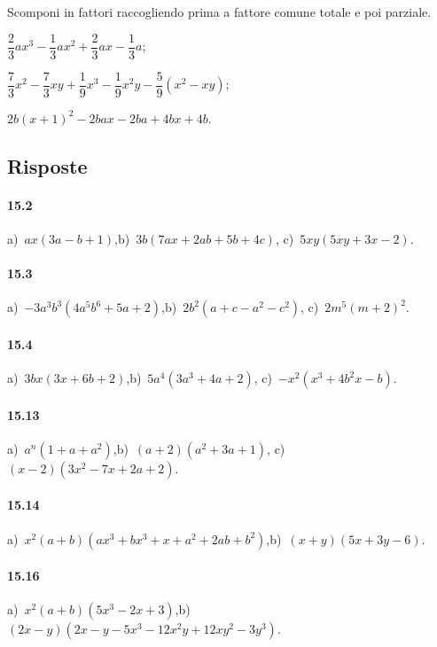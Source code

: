 \begin{esercizio}[\Ast]
\label{ese:15.34}
Scomponi in fattori raccogliendo prima a fattore comune totale e poi parziale.
\begin{enumeratea}
 \item $\dfrac{2}{3}ax^{3}-\dfrac{1}{3}ax^{2}+\dfrac{2}{3}ax-\dfrac{1}{3}a$;
 \item $\dfrac{7}{3}x^{2}-\dfrac{7}{3}xy+\dfrac{1}{9}x^{3}-\dfrac{1}{9}x^{2}y-\dfrac{5}{9}(x^{2}-xy)$;
 \item $2b(x+1)^{2}-2bax-2ba+4bx+4b$.
\end{enumeratea}
\end{esercizio}

\subsection{Risposte}

\paragraph{15.2}
a)~$ax(3a-b+1)$,\quad b)~$3b(7ax+2ab+5b+4c)$, \quad c)~$5xy(5xy+3x-2)$.

\paragraph{15.3}
a)~$-3a^{3}b^{3}\left(4a^{5}b^{6}+5a+2\right)$,\quad b)~$2b^{2}(a+c-a^{2}-c^{2})$, \quad c)~$2m^{5}\left(m+2\right)^{2}$.

\paragraph{15.4}
a)~$3bx(3x+6b+2)$,\quad b)~$5a^{4}\left(3a^{3}+4a+2\right)$, \quad c)~$-x^{2}\left(x^{3}+4b^{2}x-b\right)$.

\paragraph{15.13}
a)~$a^{n}(1+a+a^{2})$,\quad b)~$(a+2)\left(a^{2}+3a+1\right)$, \quad c)~$(x-2)\left(3x^2-7x+2a+2\right)$.

\paragraph{15.14}
a)~$x^{2}(a+b)(ax^{3}+bx^{3}+x+a^{2}+2ab+b^{2})$,\quad b)~$(x+y)\left(5x+3y-6\right)$.

\paragraph{15.16}
a)~$x^{2}(a+b)(5x^{3}-2x+3)$,\quad b)~$(2x-y)\left(2x-y-5x^3-12x^2y+12xy^2-3y^3\right)$.

